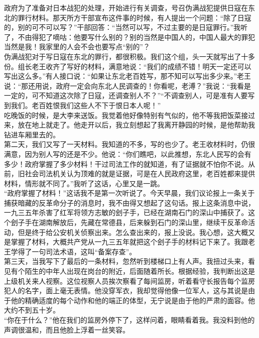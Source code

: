 政府为了准备对日本战犯的处理，开始进行有关调查，号召伪满战犯提供日寇在东北的罪行材料。那天所方干部宣布这件事的时候，有人提出一个问题：“除了日寇的，别的可不可以写？”干部回答：“当然可以写，不过主要的是日寇罪行。”我听了，不由得犯了嘀咕：他要写什么别的？别的当然是中国人的，中国人最大的罪犯当然是我！我家里的人会不会也要写点“别的”？\\

伪满战犯对于写日寇在东北的罪行，都很积极。我们这个组，头一天就写出了十多份。组长老王收齐了写好的材料，满意地说：“我们的成绩不错！明天一定还可以写出这么多。”有人接口说：“如果让东北老百姓写，那不知可以写出多少来。”老王说：“那还用说，政府一定会向东北人民调查的！你看呢，老溥？”我说：“我看是一定的，可不知道这次除了日寇，还调查别人不？”“不调查别人，可是准有人要写到我们。老百姓恨我们这些人不下于恨日本人呢！”\\

吃晚饭的时候，是大李来送饭。我觉着他好像特别有气似的，他不等我把饭菜接过来，放在地上就走了。他走开以后，我立刻想起了我离开静园的时候，是他帮助我钻进车厢里去的。\\

第二天，我们又写了一天材料。我知道的不多，写的也少了。老王收材料时，仍很满意，因为别人写的还是不少。他说：“你们瞧吧，以此推想，东北人民写的会有多少！政府掌握了多少材料！干过司法工作的就知道，有了证据就不怕你不说。从前，旧社会司法机关认为顶难的就是证据，可是在人民政府这里，老百姓都来提供材料，情形就不同了。”我听了这话，心里又是一跳。\\

“政府掌握了材料！”这话我不是第一次听说了。今天早晨，我们议论报上一条关于捕获暗藏的反革命分子的消息时，我不由得又想起了这句话。报上这条消息中说，一九三五年杀害了红军将领方志敏的刽子手，已经在湖南石门的深山中捕获了。这个刽子手在湖南解放后，先藏在常德县，后来躲到石门的深山里，继续干反革命活动，但是终于给公安机关侦察出来。怎么查出来的，报上没说。我心想，这大概又是掌握了材料，大概共产党从一九三五年就把这个刽子手的材料记下来了。我跟老王学得了一句司法术语，这叫“备案存查”。\\

第三天，当我写下了最后的一条材料，忽然听到楼梯口上有人声。我扭过头来，看见有个陌生的中年人出现在岗台的附近，后面随着所长。根据经验，我判断出这是上级机关来人视察。这位视察人员挨次察看了每间监房，听着看守长报告每个监房犯人的名字，面上毫无表情。他没穿军衣，我却觉得他像一位军人，这与其说是由于他的精确适度的每个动作和他的端正的体型，无宁说是由于他的严肃的面容。他大约不到五十岁。\\

“你在于什么？”他在我们的监房外停下了，这样问着，眼睛看着我。我没料到他的声调很温和，而且他脸上浮着一丝笑容。\\

